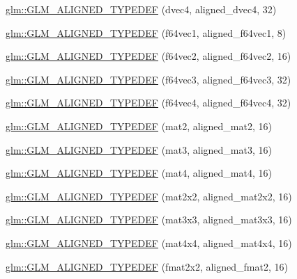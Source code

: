\begin{DoxyCompactItemize}
\item 
\hyperlink{group__gtx__type__aligned_ga687d5b8f551d5af32425c0b2fba15e99}{glm\-::\-G\-L\-M\-\_\-\-A\-L\-I\-G\-N\-E\-D\-\_\-\-T\-Y\-P\-E\-D\-E\-F} (dvec4, aligned\-\_\-dvec4, 32)
\item 
\hyperlink{group__gtx__type__aligned_ga8e842371d46842ff8f1813419ba49d0f}{glm\-::\-G\-L\-M\-\_\-\-A\-L\-I\-G\-N\-E\-D\-\_\-\-T\-Y\-P\-E\-D\-E\-F} (f64vec1, aligned\-\_\-f64vec1, 8)
\item 
\hyperlink{group__gtx__type__aligned_ga32814aa0f19316b43134fc25f2aad2b9}{glm\-::\-G\-L\-M\-\_\-\-A\-L\-I\-G\-N\-E\-D\-\_\-\-T\-Y\-P\-E\-D\-E\-F} (f64vec2, aligned\-\_\-f64vec2, 16)
\item 
\hyperlink{group__gtx__type__aligned_gaf3d3bbc1e93909b689123b085e177a14}{glm\-::\-G\-L\-M\-\_\-\-A\-L\-I\-G\-N\-E\-D\-\_\-\-T\-Y\-P\-E\-D\-E\-F} (f64vec3, aligned\-\_\-f64vec3, 32)
\item 
\hyperlink{group__gtx__type__aligned_ga804c654cead1139bd250f90f9bb01fad}{glm\-::\-G\-L\-M\-\_\-\-A\-L\-I\-G\-N\-E\-D\-\_\-\-T\-Y\-P\-E\-D\-E\-F} (f64vec4, aligned\-\_\-f64vec4, 32)
\item 
\hyperlink{group__gtx__type__aligned_gafed7d010235a3aa7ea2f88646858f2ae}{glm\-::\-G\-L\-M\-\_\-\-A\-L\-I\-G\-N\-E\-D\-\_\-\-T\-Y\-P\-E\-D\-E\-F} (mat2, aligned\-\_\-mat2, 16)
\item 
\hyperlink{group__gtx__type__aligned_ga17f911ee7b78ca6d1b91c4ab51ddb73c}{glm\-::\-G\-L\-M\-\_\-\-A\-L\-I\-G\-N\-E\-D\-\_\-\-T\-Y\-P\-E\-D\-E\-F} (mat3, aligned\-\_\-mat3, 16)
\item 
\hyperlink{group__gtx__type__aligned_ga31940e6012b72110e26fdb0f54805033}{glm\-::\-G\-L\-M\-\_\-\-A\-L\-I\-G\-N\-E\-D\-\_\-\-T\-Y\-P\-E\-D\-E\-F} (mat4, aligned\-\_\-mat4, 16)
\item 
\hyperlink{group__gtx__type__aligned_ga01de96cd0b541c52d2b4a3faf65822e9}{glm\-::\-G\-L\-M\-\_\-\-A\-L\-I\-G\-N\-E\-D\-\_\-\-T\-Y\-P\-E\-D\-E\-F} (mat2x2, aligned\-\_\-mat2x2, 16)
\item 
\hyperlink{group__gtx__type__aligned_gac88a191b004bd341e64fc53b5a4d00e3}{glm\-::\-G\-L\-M\-\_\-\-A\-L\-I\-G\-N\-E\-D\-\_\-\-T\-Y\-P\-E\-D\-E\-F} (mat3x3, aligned\-\_\-mat3x3, 16)
\item 
\hyperlink{group__gtx__type__aligned_gabe8c745fa2ced44a600a6e3f19991161}{glm\-::\-G\-L\-M\-\_\-\-A\-L\-I\-G\-N\-E\-D\-\_\-\-T\-Y\-P\-E\-D\-E\-F} (mat4x4, aligned\-\_\-mat4x4, 16)
\item 
\hyperlink{group__gtx__type__aligned_ga719da577361541a4c43a2dd1d0e361e1}{glm\-::\-G\-L\-M\-\_\-\-A\-L\-I\-G\-N\-E\-D\-\_\-\-T\-Y\-P\-E\-D\-E\-F} (fmat2x2, aligned\-\_\-fmat2, 16)

\end{DoxyCompactItemize}
